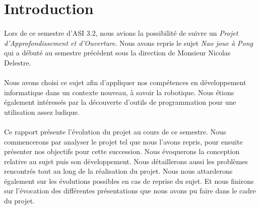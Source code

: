 \section*{Introduction}
\label{sec:Introduction}

\paragraph{} Lors de ce semestre d'ASI 3.2, nous avions la possibilité de suivre un \textit{Projet d'Approfondissement et d'Ouverture}. Nous avons repris le sujet \textit{Nao joue à Pong} qui a débuté au semestre précédent sous la direction de Monsieur Nicolas Delestre.

\paragraph{} Nous avons choisi ce sujet afin d'appliquer nos compétences en développement informatique dans un contexte nouveau, à savoir la robotique. Nous étions également intéressés par la découverte d'outils de programmation pour une utilisation assez ludique.

\paragraph{} Ce rapport présente l'évolution du projet au cours de ce semestre. Nous commencerons par analyser le projet tel que nous l'avons repris, pour ensuite présenter nos objectifs pour cette succession. Nous évoquerons la conception relative au sujet puis son développement. Nous détaillerons aussi les problèmes rencontrés tout au long de la réalisation du projet. Nous nous attarderons également sur les évolutions possibles en cas de reprise du sujet. Et nous finirons sur l'évocation des différentes présentations que nous avons pu faire dans le cadre du projet.

\pagebreak